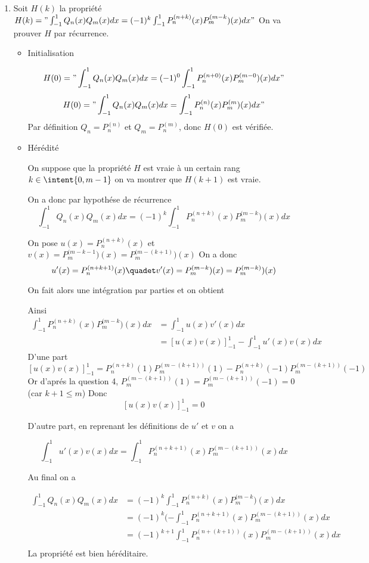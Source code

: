 \documentclass[a4paper, 11pt,reqno]{article}
\begin{document}
\begin{correction}
\begin{enumerate}
\item 
Soit $H(k)$ la propriété $H(k)="\int_{-1}^{1} Q_n(x) Q_m(x)dx = (-1)^k\int_{-1}^{1} P_n^{(n+k)}(x) P_m^{(m-k}) (x)dx" $
On va prouver $H$ par récurrence.
\begin{itemize}
\item Initialisation 

$$H(0) = "\int_{-1}^{1} Q_n(x) Q_m(x)dx =(-1)^0 \int_{-1}^{1} P_n^{(n+0)}(x) P_m^{(m-0}) (x)dx"$$
$$H(0) = "\int_{-1}^{1} Q_n(x) Q_m(x)dx =\int_{-1}^{1} P_n^{(n)}(x) P_m^{(m}) (x)dx"$$
Par définition $Q_n=P_n^{(n)} $ et $Q_m=P_n^{(m)} $, donc $H(0)$ est vérifiée. 

\item Hérédité 

On suppose que la propriété $H$ est vraie à un certain rang $k \in \intent{0,m-1}$ on va montrer que $H(k+1)$ est vraie. 

On a donc par hypothése de récurrence 
$$\int_{-1}^{1} Q_n(x) Q_m(x)dx = (-1)^k\int_{-1}^{1} P_n^{(n+k)}(x) P_m^{(m-k}) (x)dx$$

On pose $u(x)= P_n^{(n+k)}(x)$ et $v(x)= P_m^{(m-k-1}) (x)=P_m^{(m-(k+1)}) (x) $
On a donc 
$$u'(x)=  P_n^{(n+k+1)}(x)\quadet v'(x)= P_m^{(m-k}) (x)=P_m^{(m-k)}) (x)$$

On fait alors une intégration par parties et on obtient 


Ainsi 
\begin{align*}
\int_{-1}^{1} P_n^{(n+k)}(x) P_m^{(m-k}) (x)dx &= \int_{-1}^{1} u(x) v'(x)dx\\
					&=\left[u(x) v(x)\right]_{-1}^{1} - \int_{-1}^1 u'(x) v(x)dx 
\end{align*}
D'une part 
$\left[u(x) v(x)\right]_{-1}^{1}=P_n^{(n+k)}(1)P_m^{(m-(k+1))}(1) -  P_n^{(n+k)}(-1)P_m^{(m-(k+1))}(-1)$ 
Or d'aprés la question 4, $P_m^{(m-(k+1))}(1) =P_m^{(m-(k+1))}(-1)=0$
(car $k+1\leq m$)
Donc $$\left[u(x) v(x)\right]_{-1}^{1}=0$$

D'autre part, en reprenant les définitions de $u'$ et $v$ on a 

$$ \int_{-1}^1 u'(x) v(x)dx= \int_{-1}^{1} P_n^{(n+k+1)}(x) P_m^{(m-(k+1))} (x)dx$$

Au final 
on a 

\begin{align*}
\int_{-1}^{1} Q_n(x) Q_m(x)dx &= (-1)^k\int_{-1}^{1} P_n^{(n+k)}(x) P_m^{(m-k}) (x)dx\\
&= (-1)^k(- \int_{-1}^{1} P_n^{(n+k+1)}(x) P_m^{(m-(k+1))} (x)dx\\
&= (-1)^{k+1} \int_{-1}^{1} P_n^{(n+(k+1))}(x) P_m^{(m-(k+1))} (x)dx\\
\end{align*}
La propriété est bien héréditaire. 


\end{itemize}
\end{enumerate}
\end{correction}
\end{document}
